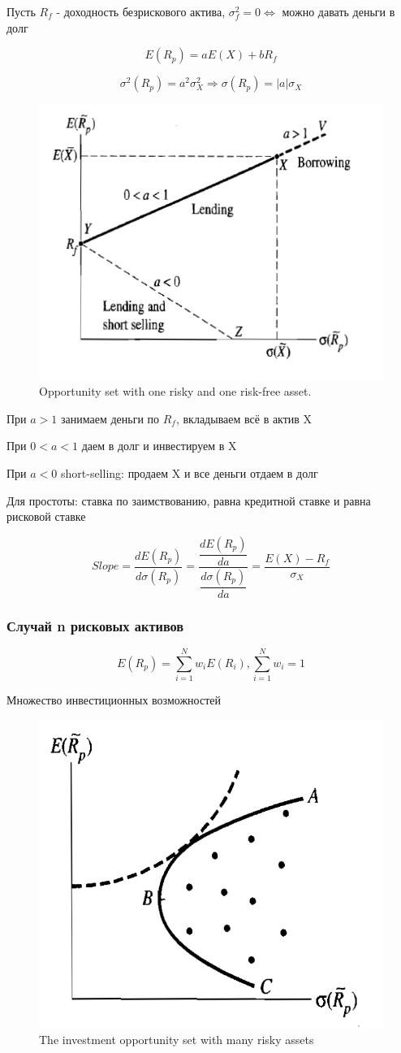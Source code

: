 \documentclass[a4paper,12pt]{article} %
\begin{document}
   Пусть 
   $ R_f $  -  доходность безрискового актива, $ \sigma^2_{f}  = 0 \Leftrightarrow $ 
    можно давать деньги в долг
    
    \[ E(R_p) = aE(X) + bR_f \]
    
    \[ \sigma^2(R_p) = a^2 \sigma^2_{X} \Rightarrow  \sigma(R_p) = |a| \sigma_{X} \]
   
   
   \begin{figure}[h!]
   	\centering
   	\includegraphics[width=0.5\linewidth]{screenshot011}
   	\caption{Opportunity set with one risky and one risk-free asset.}
   	\label{fig:screenshot011}
   \end{figure}
   
   При $ a > 1  $    
   занимаем деньги по $  R_f  $,  вкладываем всё в актив X 
   
   При $ 0 < a < 1  $    
   даем в долг и инвестируем в X 
   
    При $ a < 0  $ short-selling:     
   продаем X  и все деньги отдаем в долг 
   
   Для простоты: ставка по заимствованию, равна кредитной ставке и равна рисковой ставке 
   
    \[ 
    Slope =
    \dfrac{d E(R_p)}{d \sigma (R_p) } = \dfrac{\dfrac{d E(R_p)}{d a}}{\dfrac{d \sigma (R_p)}{da} } = \dfrac{E(X)-R_f}{\sigma_X } \]
    
     \subsubsection{Случай n рисковых активов
    }
    
    
    \[ E(R_p)  = \sum_{i=1}^{N} w_i E(R_i),    \sum_{i=1}^{N} w_i = 1 \]
    
    
        
        Множество инвестиционных возможностей  
        
           \begin{figure}[h!]
        	\centering
        	\includegraphics[width=0.4\linewidth]{screenshot012}
        	\caption{The investment opportunity set with
        		many risky assets}
        	\label{fig:screenshot012}
        \end{figure}
        
\end{document}
